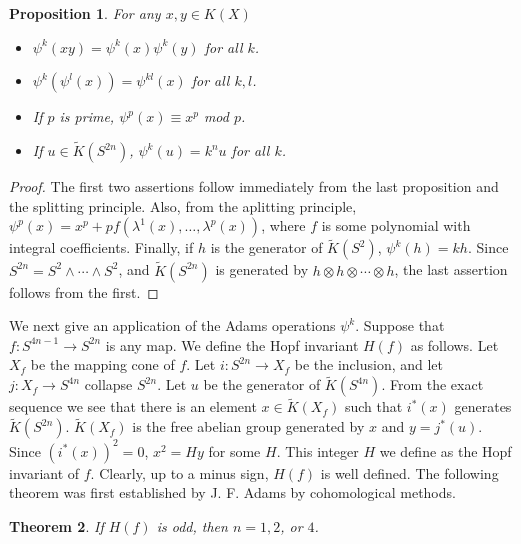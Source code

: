 \documentclass[leqno]{book}
\numberwithin{equation}{section}
\newtheorem{theorem}{Theorem}[section]%
\newtheorem{proposition}[theorem]{Proposition}
\theoremstyle{definition}
\begin{document}
            \begin{proposition}
              For any $x,y \in K(X)$
              \begin{itemize}
                \item[(1)] $\psi^{k}(xy)=\psi^{k}(x)\psi^{k}(y)$ for all $k$.
                \item[(2)] $\psi^{k}(\psi^{l}(x))=\psi^{kl}(x)$ for all $k,l$.
                \item[(3)] If $p$ is prime, $\psi^{p}(x)\equiv x^{p}$ mod $p$.
                \item[(4)] If $u \in \tilde{K}(S^{2n})$, $\psi^{k}(u)=k^{n}u$ for all $k$.
              \end{itemize}
            \end{proposition}

            \begin{proof}
              The first two assertions follow immediately from the last proposition and the splitting principle. Also, from the aplitting principle, $\psi^{p}(x)=x^{p}+pf(\lambda^{1}(x), \ldots ,\lambda^{p}(x))$, where $f$ is some polynomial with integral coefficients. Finally, if $h$ is the generator of $\tilde{K}(S^{2})$, $\psi^{k}(h)=kh$. Since $S^{2n}=S^{2}\wedge \cdots \wedge S^{2}$, and $\tilde{K}(S^{2n})$ is generated by $h\otimes h\otimes \cdots \otimes h$, the last assertion follows from the first.
            \end{proof}

            We next give an application of the Adams operations $\psi^{k}$. Suppose that $f:S^{4n-1}\to S^{2n}$ is any map. We define the Hopf invariant $H(f)$ as follows. Let $X_{f}$ be the mapping cone of $f$. Let $i:S^{2n}\to X_{f}$ be the inclusion, and let $j:X_{f}\to S^{4n}$ collapse $S^{2n}$. Let $u$ be the generator of $\tilde{K}(S^{4n})$. From the exact sequence we see that there is an element $x \in \tilde{K}(X_{f})$ such that $i^{*}(x)$ generates $\tilde{K}(S^{2n})$. $\tilde{K}(X_{f})$ is the free abelian group generated by $x$ and $y=j^{*}(u)$. Since $(i^{*}(x))^{2}=0$, $x^{2}=Hy$ for some $H$. This integer $H$ we define as the Hopf invariant of $f$. Clearly, up to a minus sign, $H(f)$ is well defined. The following theorem was first established by J. F. Adams by cohomological methods.

            \begin{theorem}
              If $H(f)$ is odd, then $n=1,2$, or $4$.
            \end{theorem}
\end{document}
